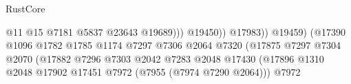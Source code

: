 \begin{lexlean}{RustCore}
\begin{coremodule}
                                                                          @11
                                                                          @15
                                                                          @7181
                                                                          @5837
                                                                          @23643
                                                                          @19689)))
                                                                    @19450))
                                                                @17983))
                                                            @19459)
                                                          (@17390
                                                            @1096
                                                            @1782
                                                            @1785
                                                            @1174
                                                            @7297
                                                            @7306
                                                            @2064
                                                            @7320
                                                            (@17875
                                                              @7297
                                                              @7304
                                                              @2070
                                                              (@17882
                                                                @7296
                                                                @7303
                                                                @2042
                                                                @7283
                                                                @2048
                                                                @17430
                                                                (@17896
                                                                  @1310
                                                                  @2048
                                                                  @17902
                                                                  @17451
                                                                  @7972
                                                                  (@7955 (@7974 @7290 @2064)))
                                                                @7972

\end{coremodule}
\end{lexlean}
